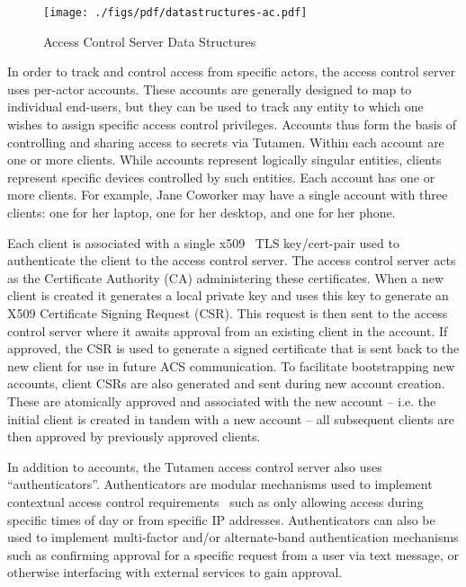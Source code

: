 \begin{figure}[th]
  \centering
  \texttt{[image: ./figs/pdf/datastructures-ac.pdf]}
  \caption{Access Control Server Data Structures}
  \label{fig:tutamen:acstructs}
\end{figure}

In order to track and control access from specific actors, the access
control server uses per-actor accounts. These accounts are generally
designed to map to individual end-users, but they can be used to track
any entity to which one wishes to assign specific access control
privileges. Accounts thus form the basis of controlling and sharing
access to secrets via Tutamen. Within each account are one or more
clients. While accounts represent logically singular entities, clients
represent specific devices controlled by such entities. Each account
has one or more clients. For example, Jane Coworker may have a single
account with three clients: one for her laptop, one for her desktop,
and one for her phone.

Each client is associated with a single x509~\cite{rfc5280} TLS
key/cert-pair used to authenticate the client to the access control
server. The access control server acts as the Certificate Authority
(CA) administering these certificates. When a new client is created it
generates a local private key and uses this key to generate an X509
Certificate Signing Request (CSR). This request is then sent to the
access control server where it awaits approval from an existing client
in the account. If approved, the CSR is used to generate a signed
certificate that is sent back to the new client for use in future ACS
communication. To facilitate bootstrapping new accounts, client CSRs
are also generated and sent during new account creation. These are
atomically approved and associated with the new account -- i.e. the
initial client is created in tandem with a new account -- all
subsequent clients are then approved by previously approved clients.

In addition to accounts, the Tutamen access control server also uses
``authenticators''. Authenticators are modular mechanisms used to
implement contextual access control requirements~\cite{hulsebosch2005}
such as only allowing access during specific times of day or from
specific IP addresses. Authenticators can also be used to implement
multi-factor and/or alternate-band authentication mechanisms such as
confirming approval for a specific request from a user via text
message, or otherwise interfacing with external services to gain
approval.

